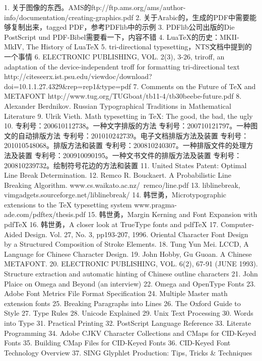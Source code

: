 1. 关于图像的东西。AMS的ftp://ftp.ams.org/ams/author-info/documentation/creating-graphics.pdf
2. 关于Arabic的，生成的PDF中需要能够复制出来，tagged PDF，参考PDFlib中的示例
3. PDFlib公司出版的Die PostScript und PDF-Bibel需要看一下，内容不错
4. LuaTeX的历史：MKII-MkIV, The History of LuaTeX
5. tri-directional typesetting，NTS文档中提到的一个事情
6. ELECTRONIC PUBLISHING, VOL. 2(3), 3-26, triroff, an adaptation of the device-independent troff for formatting tri-directional text
   http://citeseerx.ist.psu.edu/viewdoc/download?doi=10.1.1.27.4329&rep=rep1&type=pdf
7. Comments on the Future of TeX and METAFONT
   http://www.tug.org/TUGboat/tb11-4/tb30beebe-future.pdf
8. Alexander Berdnikov. Russian Typographical Traditions in Mathematical Literature
9. Ulrik Vieth. Math typesetting in TeX: The good, the bad, the ugly
10. 专利号：200610112738。一种文字排版的方法
    专利号：200710121797。一种图文的自动排版方法
    专利号：201010242739。电子文档排版方法及装置
    专利号：201010548068。排版方法和装置
    专利号：200810240307。一种排版文件的处理方法及装置
    专利号：200910090195。一种文书文件的排版方法及装置
    专利号：200810239732。绘制符号花边的方法和装置
11. United States Patent: Optimal Line Break Determination.
12. Remco R. Bouckaert. A Probabilistic Line Breaking Algorithm.
    www.cs.waikato.ac.nz/~remco/line.pdf
13. liblinebreak, vimgadgets.sourceforge.net/liblinebreak/
14. 韩世勇，Microtypographic extensions to the TeX typesetting system
    www.pragma-ade.com/pdftex/thesis.pdf
15. 韩世勇，Margin Kerning and Font Expansion with pdfTeX
16. 韩世勇，A closer look at TrueType fonts and pdfTeX
17. Computer-Aided Design. Vol. 27, No. 3, pp193-207, 1996. Oriental Character Font Design by a Structured Composition of Stroke Elements.
18. Tung Yun Mei. LCCD, A Language for Chinese Character Design.
19. John Hobby, Gu Guoan. A Chinese METAFONT.
20. ELECTRONIC PUBLISHING, VOL. 6(2), 67-91 (JUNE 1993). Structure extraction and automatic hinting of Chinese outline characters
21. John Plaice on Omega and Beyond (an interview)
22. Omega and OpenType Fonts
23. Adobe Font Metrics File Format Specification
24. Multiple Master math extension fonts
25. Breaking Paragraphs into Lines
26. The Oxford Guide to Style
27. Type Rules
28. Unicode Explained
29. Unix Text Processing
30. Words into Type
31. Practical Printing
32. PostScript Language Reference
33. Literate Programming
34. Adobe CJKV Character Collections and CMaps for CID-Keyed Fonts
35. Building CMap Files for CID-Keyed Fonts
36. CID-Keyed Font Technology Overview
37. SING Glyphlet Production: Tips, Tricks & Techniques
